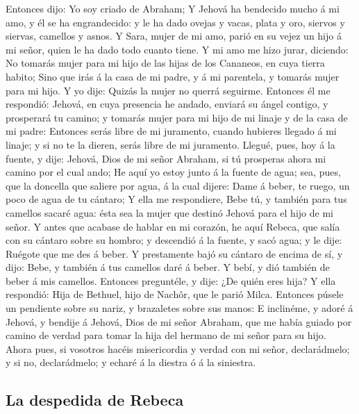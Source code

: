  Entonces dijo: Yo soy criado de Abraham;  Y
Jehová ha bendecido mucho á mi amo, y él se ha engrandecido: y le ha
dado ovejas y vacas, plata y oro, siervos y siervas, camellos y asnos.
 Y Sara, mujer de mi amo, parió en su vejez un hijo á mi
señor, quien le ha dado todo cuanto tiene.  Y mi amo me
hizo jurar, diciendo: No tomarás mujer para mi hijo de las hijas de los
Cananeos, en cuya tierra habito;  Sino que irás á la casa
de mi padre, y á mi parentela, y tomarás mujer para mi hijo.
 Y yo dije: Quizás la mujer no querrá seguirme.
 Entonces él me respondió: Jehová, en cuya presencia he
andado, enviará su ángel contigo, y prosperará tu camino; y tomarás
mujer para mi hijo de mi linaje y de la casa de mi padre: 
Entonces serás libre de mi juramento, cuando hubieres llegado á mi
linaje; y si no te la dieren, serás libre de mi juramento. 
Llegué, pues, hoy á la fuente, y dije: Jehová, Dios de mi señor Abraham,
si tú prosperas ahora mi camino por el cual ando;  He aquí
yo estoy junto á la fuente de agua; sea, pues, que la doncella que
saliere por agua, á la cual dijere: Dame á beber, te ruego, un poco de
agua de tu cántaro;  Y ella me respondiere, Bebe tú, y
también para tus camellos sacaré agua: ésta sea la mujer que destinó
Jehová para el hijo de mi señor.  Y antes que acabase de
hablar en mi corazón, he aquí Rebeca, que salía con su cántaro sobre su
hombro; y descendió á la fuente, y sacó agua; y le dije: Ruégote que me
des á beber.  Y prestamente bajó su cántaro de encima de
sí, y dijo: Bebe, y también á tus camellos daré á beber. Y bebí, y dió
también de beber á mis camellos.  Entonces preguntéle, y
dije: ¿De quién eres hija? Y ella respondió: Hija de Bethuel, hijo de
Nachôr, que le parió Milca. Entonces púsele un pendiente sobre su nariz,
y brazaletes sobre sus manos:  E inclinéme, y adoré á
Jehová, y bendije á Jehová, Dios de mi señor Abraham, que me había
guiado por camino de verdad para tomar la hija del hermano de mi señor
para su hijo.  Ahora pues, si vosotros hacéis misericordia
y verdad con mi señor, declarádmelo; y si no, declarádmelo; y echaré á
la diestra ó á la siniestra.

\hypertarget{la-despedida-de-rebeca}{%
\subsection{La despedida de Rebeca}\label{la-despedida-de-rebeca}}


